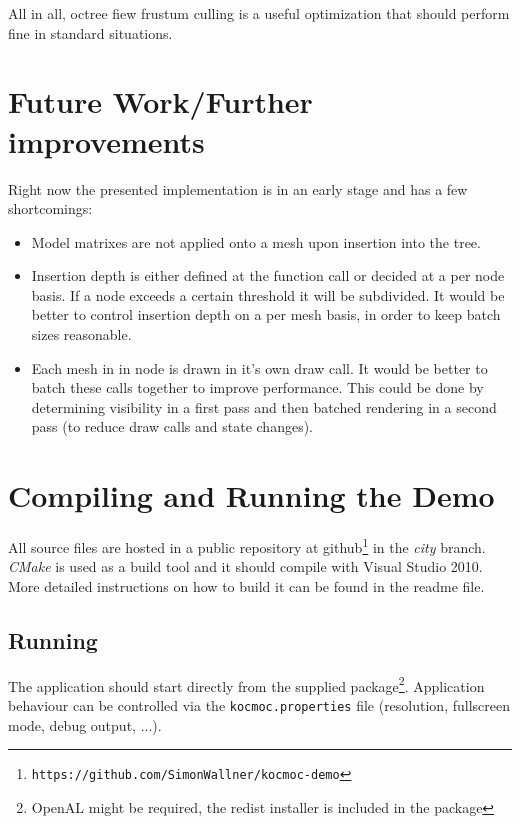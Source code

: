 \documentclass[a4, 12pt]{scrartcl}
\begin{document}
All in all, octree fiew frustum culling is a useful optimization that should perform fine in standard situations.


\section{Future Work/Further improvements}
Right now the presented implementation is in an early stage and has a few shortcomings:
\begin{itemize}
\item Model matrixes are not applied onto a mesh upon insertion into the tree.
\item Insertion depth is either defined at the function call or decided at a per node basis. If a node exceeds a certain threshold it will be subdivided. It would be better to control insertion depth on a per mesh basis, in order to keep batch sizes reasonable. 
\item Each mesh in in node is drawn in it's own draw call. It would be better to batch these calls together to improve performance. This could be done by determining visibility in a first pass and then batched rendering in a second pass (to reduce draw calls and state changes).
\end{itemize}


\section{Compiling and Running the Demo}
All source files are hosted in a public repository at github\footnote{\texttt{https://github.com/SimonWallner/kocmoc-demo}} in the \emph{city} branch. \emph{CMake} is used as a build tool and it should compile with Visual Studio 2010. More detailed instructions on how to build it can be found in the readme file.

\subsection{Running}
The application should start directly from the supplied package\footnote{OpenAL might be required, the redist installer is included in the package}. Application behaviour can be controlled via the \texttt{kocmoc.properties} file (resolution, fullscreen mode, debug output, ...).
\end{document}
